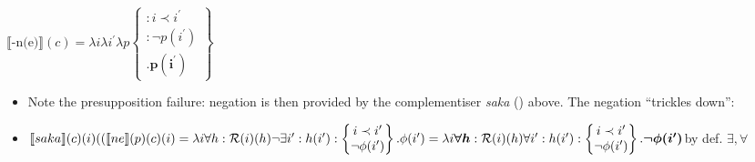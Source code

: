 \documentclass[10pt]{article}
\begin{document}
\begin{itemize}
\ex	$\llbracket\text{-n(e)}\rrbracket(c)=\lambda i\lambda i^\prime\lambda p
	\begin{Bmatrix}
		:i\prec i^\prime\\
		:\neg p(i^\prime)\\
		.\boldsymbol{p(i^\prime)}
	\end{Bmatrix}$	\xe
	\begin{itemize}


	\item Note the presupposition failure: negation is then provided by the complementiser \textit{saka} (\blastx) above. The negation ``trickles down'':
	
	\item $\llbracket saka\rrbracket(c)(i)((\llbracket ne\rrbracket(p)(c)(i)=\lambda i\forall h:\mathcal R(i)(h)\neg\exists i^\prime:h(i^\prime):\begin{Bmatrix}
	i\prec i^\prime\\
	\neg\phi (i^\prime)\\
	\end{Bmatrix}.\phi(i^\prime)\\
	=\lambda i\boldsymbol{\forall h}:\mathcal R(i)(h)\forall i^\prime:h(i^\prime):\begin{Bmatrix}
		i\prec i^\prime\\
		\neg\phi (i^\prime)\\
	\end{Bmatrix}.\boldsymbol{\neg\phi(i^\prime)}$\hfill by def. $\exists,\forall$
		\end{itemize}
		\end{itemize}
\end{document}
